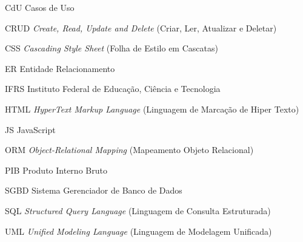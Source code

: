 %
%

\begin{siglas}
	\setlength{\baselineskip}{0.7\baselineskip}

	\item[CdU] Casos de Uso
	\item[CRUD] \textit{Create, Read, Update and Delete} (Criar, Ler, Atualizar e Deletar)
	\item[CSS] \textit{Cascading Style Sheet} (Folha de Estilo em Cascatas)
	\item[ER] Entidade Relacionamento
	\item[IFRS] Instituto Federal de Educação, Ciência e Tecnologia
	\item[HTML] \textit{HyperText Markup Language} (Linguagem de Marcação de Hiper Texto)
	\item[JS] JavaScript
	\item[ORM] \textit{Object-Relational Mapping} (Mapeamento Objeto Relacional)
	\item[PIB] Produto Interno Bruto
	\item[SGBD] Sistema Gerenciador de Banco de Dados
	\item[SQL] \textit{Structured Query Language} (Linguagem de Consulta Estruturada)
	\item[UML] \textit{Unified Modeling Language} (Linguagem de Modelagem Unificada)

\end{siglas}
